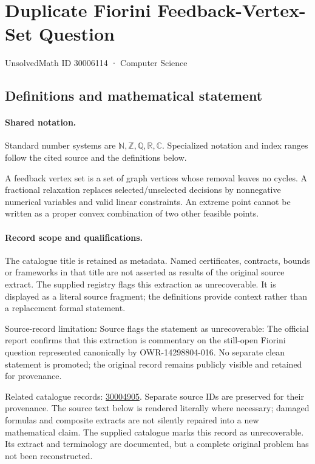 \documentclass[11pt]{article}
\begin{document}
\setcounter{section}{30006113}
\section{Duplicate Fiorini Feedback-Vertex-Set Question}\label{30006114}
{\small\sffamily UnsolvedMath ID 30006114 · Computer Science}
\subsection{Definitions and mathematical statement}

\paragraph{Shared notation.}Standard number systems are $\mathbb N,\mathbb Z,\mathbb Q,\mathbb R,\mathbb C$. Specialized notation and index ranges follow the cited source and the definitions below.


A feedback vertex set is a set of graph vertices whose removal leaves no cycles. A fractional relaxation replaces selected/unselected decisions by nonnegative numerical variables and valid linear constraints. An extreme point cannot be written as a proper convex combination of two other feasible points.
\paragraph{Record scope and qualifications.}
The catalogue title is retained as metadata. Named certificates, contracts, bounds or frameworks in that title are not asserted as results of the original source extract.
The supplied registry flags this extraction as unrecoverable. It is displayed as a literal source fragment; the definitions provide context rather than a replacement formal statement.

Source-record limitation: Source flags the statement as unrecoverable: The official report confirms that this extraction is commentary on the still-open Fiorini question represented canonically by OWR-14298804-016. No separate clean statement is promoted; the original record remains publicly visible and retained for provenance.

Related catalogue records: \href{https://mehmetmars7.github.io/Erdosproblems-llm-hunter/problem.html?type=open_problems&id=30004905}{30004905}. Separate source IDs are preserved for their provenance.
The source text below is rendered literally where necessary; damaged formulas and composite extracts are not silently repaired into a new mathematical claim.
The supplied catalogue marks this record as unrecoverable. Its extract and terminology are documented, but a complete original problem has not been reconstructed.
\end{document}
